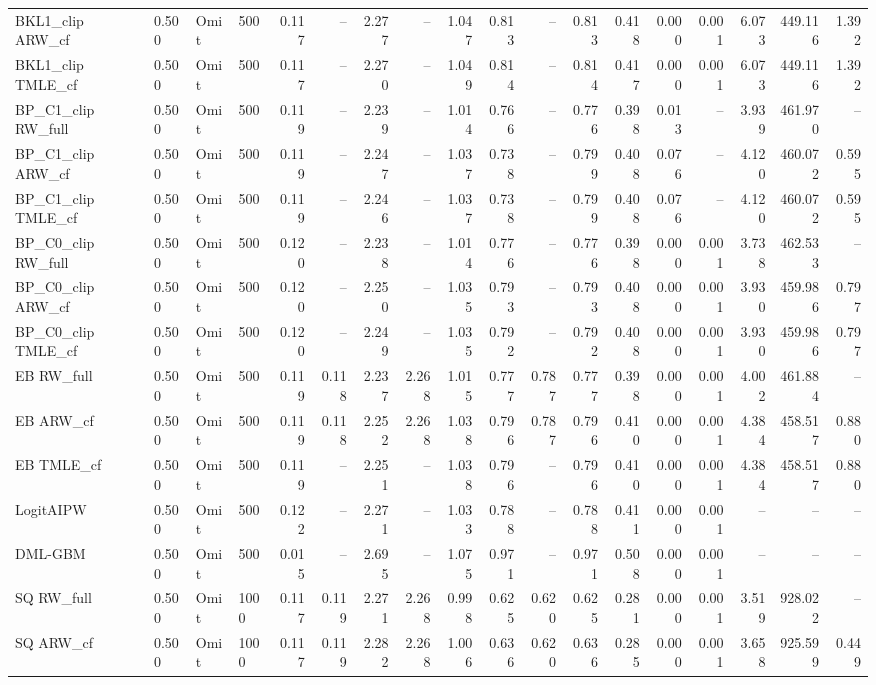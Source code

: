 \begin{tabular}{llllrrrrrrrrrrrrrr}
BKL1\_clip ARW\_cf & 0.500 & Omit & 500 & 0.117 & -- & 2.277 & -- & 1.047 & 0.813 & -- & 0.813 & 0.418 & 0.000 & 0.001 & 6.073 & 449.116 & 1.392 \\
BKL1\_clip TMLE\_cf & 0.500 & Omit & 500 & 0.117 & -- & 2.270 & -- & 1.049 & 0.814 & -- & 0.814 & 0.417 & 0.000 & 0.001 & 6.073 & 449.116 & 1.392 \\
BP\_C1\_clip RW\_full & 0.500 & Omit & 500 & 0.119 & -- & 2.239 & -- & 1.014 & 0.766 & -- & 0.776 & 0.398 & 0.013 & -- & 3.939 & 461.970 & -- \\
BP\_C1\_clip ARW\_cf & 0.500 & Omit & 500 & 0.119 & -- & 2.247 & -- & 1.037 & 0.738 & -- & 0.799 & 0.408 & 0.076 & -- & 4.120 & 460.072 & 0.595 \\
BP\_C1\_clip TMLE\_cf & 0.500 & Omit & 500 & 0.119 & -- & 2.246 & -- & 1.037 & 0.738 & -- & 0.799 & 0.408 & 0.076 & -- & 4.120 & 460.072 & 0.595 \\
BP\_C0\_clip RW\_full & 0.500 & Omit & 500 & 0.120 & -- & 2.238 & -- & 1.014 & 0.776 & -- & 0.776 & 0.398 & 0.000 & 0.001 & 3.738 & 462.533 & -- \\
BP\_C0\_clip ARW\_cf & 0.500 & Omit & 500 & 0.120 & -- & 2.250 & -- & 1.035 & 0.793 & -- & 0.793 & 0.408 & 0.000 & 0.001 & 3.930 & 459.986 & 0.797 \\
BP\_C0\_clip TMLE\_cf & 0.500 & Omit & 500 & 0.120 & -- & 2.249 & -- & 1.035 & 0.792 & -- & 0.792 & 0.408 & 0.000 & 0.001 & 3.930 & 459.986 & 0.797 \\
EB RW\_full & 0.500 & Omit & 500 & 0.119 & 0.118 & 2.237 & 2.268 & 1.015 & 0.777 & 0.787 & 0.777 & 0.398 & 0.000 & 0.001 & 4.002 & 461.884 & -- \\
EB ARW\_cf & 0.500 & Omit & 500 & 0.119 & 0.118 & 2.252 & 2.268 & 1.038 & 0.796 & 0.787 & 0.796 & 0.410 & 0.000 & 0.001 & 4.384 & 458.517 & 0.880 \\
EB TMLE\_cf & 0.500 & Omit & 500 & 0.119 & -- & 2.251 & -- & 1.038 & 0.796 & -- & 0.796 & 0.410 & 0.000 & 0.001 & 4.384 & 458.517 & 0.880 \\
LogitAIPW & 0.500 & Omit & 500 & 0.122 & -- & 2.271 & -- & 1.033 & 0.788 & -- & 0.788 & 0.411 & 0.000 & 0.001 & -- & -- & -- \\
DML-GBM & 0.500 & Omit & 500 & 0.015 & -- & 2.695 & -- & 1.075 & 0.971 & -- & 0.971 & 0.508 & 0.000 & 0.001 & -- & -- & -- \\
SQ RW\_full & 0.500 & Omit & 1000 & 0.117 & 0.119 & 2.271 & 2.268 & 0.998 & 0.625 & 0.620 & 0.625 & 0.281 & 0.000 & 0.001 & 3.519 & 928.022 & -- \\
SQ ARW\_cf & 0.500 & Omit & 1000 & 0.117 & 0.119 & 2.282 & 2.268 & 1.006 & 0.636 & 0.620 & 0.636 & 0.285 & 0.000 & 0.001 & 3.658 & 925.599 & 0.449 \\

\end{tabular}

